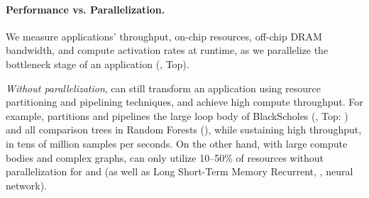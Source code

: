 \paragraph{Performance vs. Parallelization.}
We measure applications' throughput, on-chip resources, off-chip DRAM bandwidth, and compute activation rates at runtime, as we parallelize the bottleneck stage of an application (, Top).

{\em Without parallelization}, \name{} can still transform an application using resource partitioning and pipelining techniques, and achieve high compute throughput.%
For example, \name{} partitions and pipelines the large loop body of BlackScholes (, Top: ) and all comparison trees in Random Forests (), while sustaining high throughput, in tens of million samples per seconds.
On the other hand, with large compute bodies and complex graphs, \name{} can only utilize 10--50\% of resources without parallelization for  and  (as well as Long Short-Term Memory Recurrent, , neural network).

